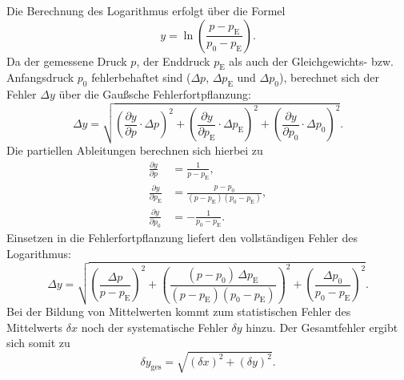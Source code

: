 Die Berechnung des Logarithmus erfolgt über die Formel
\begin{equation}
    y = \ln\left( \frac{p - p_{\text{E}}}{p_0 - p_{\text{E}}} \right).
\end{equation}
Da der gemessene Druck $p$, der Enddruck $p_{\text{E}}$ als auch der Gleichgewichts- bzw. Anfangsdruck $p_0$ fehlerbehaftet sind ($\Delta p$, $\Delta p_{\text{E}}$ und $\Delta p_0$), berechnet sich der Fehler $\Delta y$ über die Gaußsche Fehlerfortpflanzung:
\begin{equation}
    \Delta y = \sqrt{ \left( \frac{\partial y}{\partial p} \cdot \Delta p \right)^2 + \left( \frac{\partial y}{\partial p_{\text{E}}} \cdot \Delta p_{\text{E}} \right)^2 + \left( \frac{\partial y}{\partial p_0} \cdot \Delta p_0 \right)^2 }.
\end{equation}
Die partiellen Ableitungen berechnen sich hierbei zu
\begin{align}
    \frac{\partial y}{\partial p}            &= \frac{1}{p - p_{\text{E}}}, \\[6pt]
    \frac{\partial y}{\partial p_{\text{E}}}      &= \frac{p - p_0}{(p - p_{\text{E}})(p_0 - p_{\text{E}})}, \\[6pt]
    \frac{\partial y}{\partial p_0}          &= -\frac{1}{p_0 - p_{\text{E}}}.
\end{align}
Einsetzen in die Fehlerfortpflanzung liefert den vollständigen Fehler des Logarithmus:
\begin{equation}
    \Delta y = \sqrt{ \left( \frac{\Delta p}{p - p_{\text{E}}} \right)^2 + \left( \frac{(p - p_0) \, \Delta p_{\text{E}}}{(p - p_{\text{E}})(p_0 - p_{\text{E}})} \right)^2 + \left( \frac{\Delta p_0}{p_0 - p_{\text{E}}} \right)^2 }.
\end{equation}
Bei der Bildung von Mittelwerten kommt zum statistischen Fehler des Mittelwerts $\delta x$ noch der systematische Fehler $\delta y$ hinzu. Der Gesamtfehler ergibt sich somit zu
\begin{equation}
    \delta y_{\text{ges}} = \sqrt{(\delta x)^2 + (\delta y)^2}.
\end{equation}